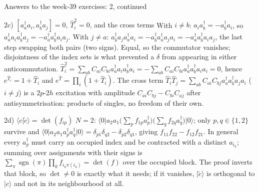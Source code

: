 \documentclass[aspectratio=169,10pt]{beamer}
\newcommand{\ket}[1]{\vert #1\rangle}
\newcommand{\bra}[1]{\langle #1\vert}
\newcommand{\braket}[2]{\langle #1\vert #2\rangle}
\DeclareMathOperator{\sgn}{sgn}
\begin{document}
\begin{frame}{Answers to the week-39 exercises: 2, continued}
  \footnotesize
  \begin{block}{2c) $[a_a^{\dagger}a_i,a_b^{\dagger}a_j]=0$, $\hat T_i^2=0$, and the cross terms}
    With $i\ne b$: $a_ia_b^{\dagger}=-a_b^{\dagger}a_i$, so $a_a^{\dagger}a_ia_b^{\dagger}a_j=-a_a^{\dagger}a_b^{\dagger}a_ia_j$. With $j\ne a$: $a_b^{\dagger}a_ja_a^{\dagger}a_i=-a_b^{\dagger}a_a^{\dagger}a_ja_i=-a_a^{\dagger}a_b^{\dagger}a_ia_j$, the last step swapping both pairs (two signs). Equal, so the commutator vanishes; disjointness of the index sets is what prevented a $\delta$ from appearing in either anticommutation. $\hat T_i^2=\sum_{ab}C_{ai}C_{bi}a_a^{\dagger}a_ia_b^{\dagger}a_i=-\sum_{ab}C_{ai}C_{bi}a_a^{\dagger}a_b^{\dagger}a_ia_i=0$, hence $e^{\hat T_i}=1+\hat T_i$ and $e^{\hat T}=\prod_i(1+\hat T_i)$. The cross term $\hat T_i\hat T_j=\sum_{ab}C_{ai}C_{bj}a_a^{\dagger}a_b^{\dagger}a_ja_i$ ($i\ne j$) is a $2p$-$2h$ excitation with amplitude $C_{ai}C_{bj}-C_{bi}C_{aj}$ after antisymmetrisation: products of singles, no freedom of their own.
  \end{block}
  \begin{block}{2d) $\braket{c}{\tilde c}=\det(f_{ip})$}
    $N=2$: $\bra0a_2a_1\bigl(\sum_pf_{1p}a_p^{\dagger}\bigr)\bigl(\sum_qf_{2q}a_q^{\dagger}\bigr)\ket0$; only $p,q\in\{1,2\}$ survive and $\bra0a_2a_1a_p^{\dagger}a_q^{\dagger}\ket0=\delta_{p1}\delta_{q2}-\delta_{p2}\delta_{q1}$, giving $f_{11}f_{22}-f_{12}f_{21}$. In general every $a_p^{\dagger}$ must carry an occupied index and be contracted with a distinct $a_{i_k}$; summing over assignments with their signs is $\sum_\pi\sgn(\pi)\prod_kf_{i_k\pi(i_k)}=\det(f)$ over the occupied block. The proof inverts that block, so $\det\ne0$ is exactly what it needs; if it vanishes, $\ket{\tilde c}$ is orthogonal to $\ket c$ and not in its neighbourhood at all.
  \end{block}
\end{frame}
\end{document}
